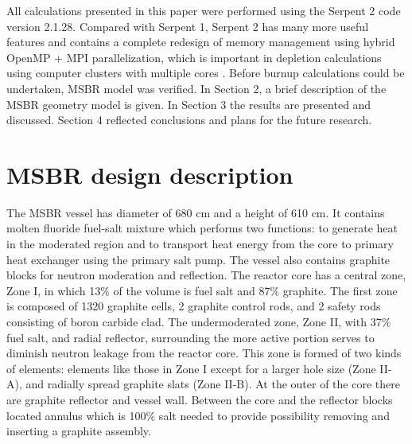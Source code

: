 \documentclass{anstrans}
\begin{document}
All calculations presented in this paper were performed using the Serpent 2 code version 2.1.28. Compared with Serpent 1, Serpent 2 has many more useful features and contains a complete redesign of memory management using hybrid OpenMP + MPI parallelization, which is important in depletion calculations using computer clusters with multiple cores \cite{leppanen_serpent_2015}. Before burnup calculations could be undertaken, MSBR model was verified. In Section 2, a brief description of the MSBR geometry model is given. In Section 3 the results are presented and discussed. Section 4 reflected conclusions and plans for the future research.

\section{MSBR design description}
The MSBR vessel has diameter of 680 cm and a height of 610 cm. It contains molten fluoride fuel-salt mixture which performs two functions: to generate heat in the moderated region and to transport heat energy from the core to primary heat exchanger using the primary salt pump. The vessel also contains graphite blocks for neutron moderation and reflection. The reactor core has a central zone, Zone I, in which 13\% of the volume is fuel salt and 87\% graphite. The first zone is composed of 1320 graphite cells, 2 graphite control rods, and 2 safety rods consisting of boron carbide clad. The undermoderated zone, Zone II, with 37\% fuel salt, and radial reflector, surrounding the more active portion serves to diminish neutron leakage from the reactor core. This zone is formed of two kinds of elements: elements like those in Zone I except for a larger hole size (Zone II-A), and radially spread graphite slats (Zone II-B). At the outer of the core there are graphite reflector and vessel wall. Between the core and the reflector blocks located annulus which is 100\% salt needed to provide possibility removing and inserting a graphite assembly. 
\end{document}

